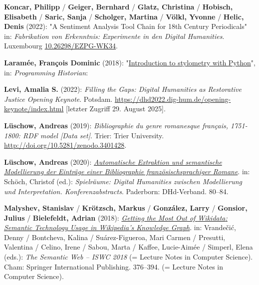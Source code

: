 \documentclass[
  12pt,
  letterpaper,
  DIV=11,
  numbers=noendperiod]{scrreprt}
\newlength{\cslhangindent}
\newenvironment{CSLReferences}[2] %
 {\begin{list}{}{%
  \setlength{\itemindent}{0pt}
  \setlength{\leftmargin}{0pt}
  \setlength{\parsep}{0pt}
  \ifodd #1
   \setlength{\leftmargin}{\cslhangindent}
   \setlength{\itemindent}{-1\cslhangindent}
  \fi
  \setlength{\itemsep}{#2\baselineskip}}}
 {\end{list}}
\begin{document}
\begin{CSLReferences}{1}{0}
\textbf{Koncar, Philipp} / \textbf{Geiger, Bernhard} / \textbf{Glatz,
Christina} / \textbf{Hobisch, Elisabeth} / \textbf{Saric, Sanja} /
\textbf{Scholger, Martina} / \textbf{Völkl, Yvonne} / \textbf{Helic,
Denis} (2022): "A {Sentiment} {Analysis} {Tool} {Chain} for 18th
{Century} {Periodicals}" in: \emph{Fabrikation von {Erkenntnis}:
{Experimente} in den {Digital} {Humanities}}. Luxembourg
\href{https://doi.org/10.26298/EZPG-WK34}{10.26298/EZPG-WK34}.

\textbf{Laramée, François Dominic} (2018):
"\href{https://programminghistorian.org/en/lessons/introduction-to-stylometry-with-python}{Introduction
to stylometry with {Python}}", in: \emph{Programming Historian}:

\textbf{Levi, Amalia S.} (2022): \emph{Filling the {Gaps}: {Digital}
{Humanities} as {Restorative} {Justice} {\textbar} {Opening} {Keynote}}.
Potsdam. \url{https://dhd2022.dig-hum.de/opening-keynote/index.html}
{[}letzter Zugriff 29. August 2025{]}.

\textbf{Lüschow, Andreas} (2019): \emph{Bibliographie du genre
romanesque français, 1751-1800: {RDF} model {[}{Data} set{]}}. Trier:
Trier University. \url{http://doi.org/10.5281/zenodo.3401428}.

\textbf{Lüschow, Andreas} (2020):
\emph{\href{https://doi.org/10.5281/zenodo.3666690}{Automatische
{Extraktion} und semantische {Modellierung} der {Einträge} einer
{Bibliographie} französischsprachiger {Romane}}}. in: Schöch, Christof
(ed.): \emph{Spielräume: {Digital} {Humanities} zwischen {Modellierung}
und {Interpretation}. {Konferenzabstracts}}. Paderborn: DHd-Verband.
80--84.

\textbf{Malyshev, Stanislav} / \textbf{Krötzsch, Markus} /
\textbf{González, Larry} / \textbf{Gonsior, Julius} /
\textbf{Bielefeldt, Adrian} (2018):
\emph{\href{https://doi.org/10.1007/978-3-030-00668-6_23}{Getting the
{Most} {Out} of {Wikidata}: {Semantic} {Technology} {Usage} in
{Wikipedia}'s {Knowledge} {Graph}}}. in: Vrandečić, Denny / Bontcheva,
Kalina / Suárez-Figueroa, Mari Carmen / Presutti, Valentina / Celino,
Irene / Sabou, Marta / Kaffee, Lucie-Aimée / Simperl, Elena (eds.):
\emph{The {Semantic} {Web} -- {ISWC} 2018} (= Lecture {Notes} in
{Computer} {Science}). Cham: Springer International Publishing.
376--394. (= Lecture {Notes} in {Computer} {Science}).


\end{CSLReferences}
\end{document}
